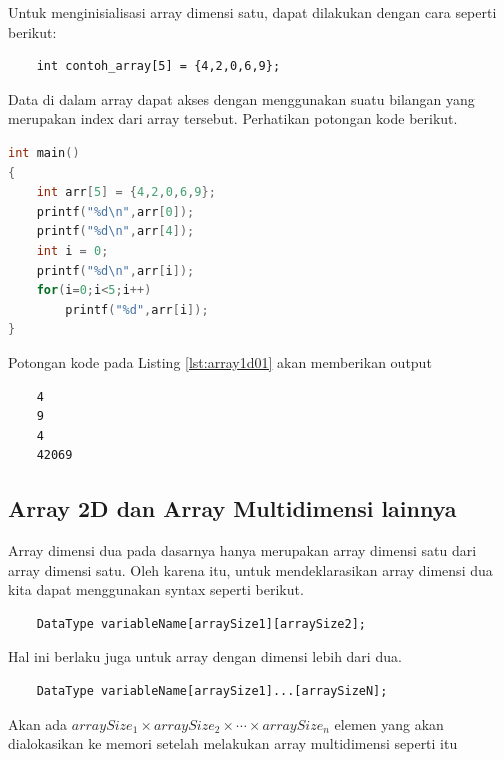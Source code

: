 Untuk menginisialisasi array dimensi satu, dapat dilakukan dengan cara seperti berikut:
\begin{verbatim}
    int contoh_array[5] = {4,2,0,6,9};
\end{verbatim}

Data di dalam array dapat akses dengan menggunakan suatu bilangan yang merupakan index dari array tersebut. Perhatikan potongan kode berikut.

\begin{lstlisting}[language=c,caption = Contoh Mengakses Array 1D,label=lst:array1d01]
int main()
{
    int arr[5] = {4,2,0,6,9};
    printf("%d\n",arr[0]);
    printf("%d\n",arr[4]);
    int i = 0;
    printf("%d\n",arr[i]);
    for(i=0;i<5;i++)
        printf("%d",arr[i]);
}
\end{lstlisting}

Potongan kode pada Listing \ref{lst:array1d01} akan memberikan output
\begin{verbatim}
    4
    9
    4
    42069
\end{verbatim}

\subsection{Array 2D dan Array Multidimensi lainnya}%
Array dimensi dua pada dasarnya hanya merupakan array dimensi satu dari array dimensi satu. Oleh karena itu, untuk mendeklarasikan array dimensi dua kita dapat menggunakan syntax seperti berikut.
\begin{verbatim}
	DataType variableName[arraySize1][arraySize2];
\end{verbatim}
Hal ini berlaku juga untuk array dengan dimensi lebih dari dua.
\begin{verbatim}
    DataType variableName[arraySize1]...[arraySizeN];
\end{verbatim}
Akan ada $arraySize_1\times arraySize_2 \times \cdots \times arraySize_n$ elemen yang akan dialokasikan ke memori setelah melakukan array multidimensi seperti itu


